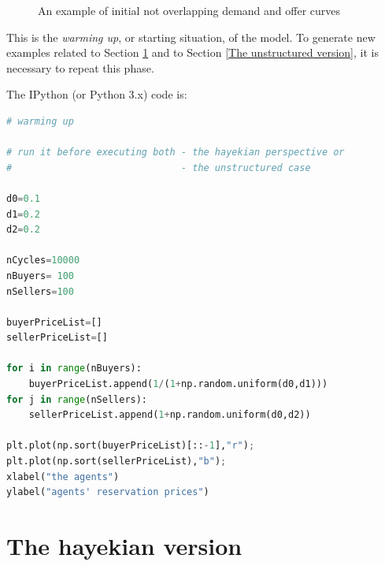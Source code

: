 \documentclass[12pt]{report}
\begin{document}
\begin{figure}[htbp]
\begin{center}
\caption{An example of initial not overlapping demand and offer curves}
\label{output_2_1.png}
\end{center}
\end{figure}

This is the \emph{warming up}, or starting situation, of the model. To generate new examples related to Section \ref{The hayekian version} and to Section \ref{The unstructured version}, it is necessary to repeat this phase.

The IPython (or Python 3.x) code is:

\begin{lstlisting}[language=Python, caption=Warming up of the model, basicstyle=\ttfamily\footnotesize]
# warming up

# run it before executing both - the hayekian perspective or
#                              - the unstructured case

d0=0.1
d1=0.2
d2=0.2

nCycles=10000
nBuyers= 100
nSellers=100

buyerPriceList=[]
sellerPriceList=[]

for i in range(nBuyers):
    buyerPriceList.append(1/(1+np.random.uniform(d0,d1)))
for j in range(nSellers):
    sellerPriceList.append(1+np.random.uniform(d0,d2))
    
plt.plot(np.sort(buyerPriceList)[::-1],"r");
plt.plot(np.sort(sellerPriceList),"b");
xlabel("the agents")
ylabel("agents' reservation prices")
\end{lstlisting}

\section{The hayekian version}\label{The hayekian version}
 
\end{document}
